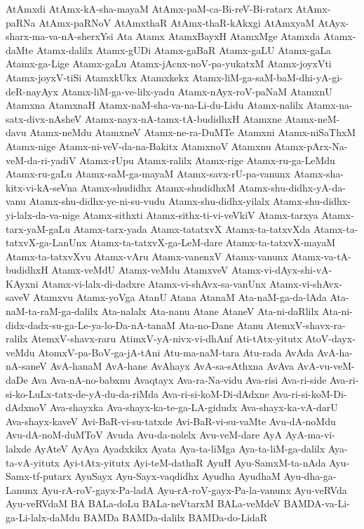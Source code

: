 {AtAmxdi
AtAmx-kA-sha-mayaM
AtAmx-paM-ca-Bi-reV-Bi-ratarx
AtAmx-paRNa
AtAmx-paRNoV
AtAmxthaR
AtAmx-thaR-kAkxgi
AtAmxyaM
AtAyx-sharx-ma-va-nA-sherxYsi
Ata
Atamx
AtamxBayxH
AtamxMge
Atamxda
Atamx-daMte
Atamx-dalilx
Atamx-gUDi
Atamx-gaBaR
Atamx-gaLU
Atamx-gaLa
Atamx-ga-Lige
Atamx-gaLu
Atamx-jAcnx-noV-pa-yukatxM
Atamx-joyxVti
Atamx-joyxV-tiSi
AtamxkUkx
Atamxkekx
Atamx-liM-ga-saM-baM-dhi-yA-gi-deR-nayAyx
Atamx-liM-ga-ve-lilx-yadu
Atamx-nAyx-roV-paNaM
AtamxnU
Atamxna
AtamxnaH
Atamx-naM-sha-va-na-Li-du-Lidu
Atamx-nalilx
Atamx-na-satx-divx-nAsheV
Atamx-nayx-nA-tamx-tA-budidhxH
Atamxne
Atamx-neM-davu
Atamx-neMdu
AtamxneV
Atamx-ne-ra-DuMTe
Atamxni
Atamx-niSaThxM
Atamx-nige
Atamx-ni-veV-da-na-Bakitx
AtamxnoV
Atamxnu
Atamx-pArx-Na-veM-da-ri-yadiV
Atamx-rUpu
Atamx-ralilx
Atamx-rige
Atamx-ru-ga-LeMdu
Atamx-ru-gaLu
Atamx-saM-ga-mayaM
Atamx-savx-rU-pa-vanunx
Atamx-sha-kitx-vi-kA-seVna
Atamx-shudidhx
Atamx-shudidhxM
Atamx-shu-didhx-yA-da-vanu
Atamx-shu-didhx-ye-ni-su-vudu
Atamx-shu-didhx-yilalx
Atamx-shu-didhx-yi-lalx-da-va-nige
Atamx-sithxti
Atamx-sithx-ti-vi-veVkiV
Atamx-tarxya
Atamx-tarx-yaM-gaLu
Atamx-tarx-yada
Atamx-tatatxvX
Atamx-ta-tatxvXda
Atamx-ta-tatxvX-ga-LanUnx
Atamx-ta-tatxvX-ga-LeM-dare
Atamx-ta-tatxvX-mayaM
Atamx-ta-tatxvXvu
Atamx-vAru
Atamx-vanenxV
Atamx-vanunx
Atamx-va-tA-budidhxH
Atamx-veMdU
Atamx-veMdu
AtamxveV
Atamx-vi-dAyx-shi-vA-KAyxni
Atamx-vi-lalx-di-dadxre
Atamx-vi-shAvx-sa-vanUnx
Atamx-vi-shAvx-saveV
Atamxvu
Atamx-yoVga
AtanU
Atana
AtanaM
Ata-naM-ga-da-lAda
Ata-naM-ta-raM-ga-dalilx
Ata-nalalx
Ata-nanu
Atane
AtaneV
Ata-ni-daRlilx
Ata-ni-didx-dadx-su-ga-Le-ya-lo-Da-nA-tanaM
Ata-no-Dane
Atanu
AtemxV-shavx-ra-ralilx
AtemxV-shavx-raru
AtimxV-yA-nivx-vi-dhAnf
Ati-tAtx-yitutx
AtoV-dayx-veMdu
AtomxV-pa-BoV-ga-jA-tAni
Atu-ma-naM-tara
Atu-rada
AvAda
AvA-ha-nA-saneV
AvA-hanaM
AvA-hane
AvAhayx
AvA-sa-sAthxna
AvAva
AvA-vu-veM-daDe
Ava
Ava-nA-no-babxnu
Avaqtayx
Ava-ra-Na-vidu
Ava-risi
Ava-ri-side
Ava-ri-si-ko-LuLx-tatx-de-yA-du-da-riMda
Ava-ri-si-koM-Di-dAdxne
Ava-ri-si-koM-Di-dAdxnoV
Ava-shayxka
Ava-shayx-ka-te-ga-LA-gidudx
Ava-shayx-ka-vA-darU
Ava-shayx-kaveV
Avi-BaR-vi-su-tatxde
Avi-BaR-vi-su-vaMte
Avu-dA-noMdu
Avu-dA-noM-duMToV
Avuda
Avu-da-nolelx
Avu-veM-dare
AyA
AyA-ma-vi-lalxde
AyAteV
AyAya
Ayadxkikx
Ayata
Aya-ta-liMga
Aya-ta-liM-ga-dalilx
Aya-ta-vA-yitutx
Ayi-tAtx-yitutx
Ayi-teM-dathaR
AyuH
Ayu-SamxM-ta-nAda
Ayu-Samx-tf-putarx
AyuSayx
Ayu-Sayx-vaqdidhx
Ayudha
AyudhaM
Ayu-dha-ga-Lanunx
Ayu-rA-roV-gayx-Pa-ladA
Ayu-rA-roV-gayx-Pa-la-vanunx
Ayu-veRVda
Ayu-veRVdaM
BA
BALa-doLu
BALa-neVtarxM
BALa-veMdeV
BAMDA-va-Li-ga-Li-lalx-daMdu
BAMDa
BAMDa-dalilx
BAMDa-do-LidaR
}
